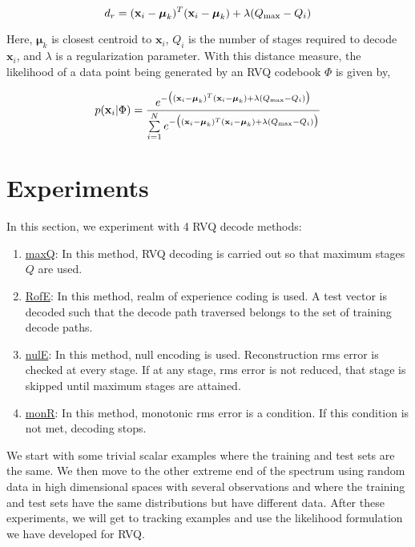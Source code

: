 \begin{equation}
d_r = (\mathbf{x}_i-\boldsymbol\mu_k)^T(\mathbf{x}_i-\boldsymbol\mu_k) + \lambda({Q_{\textrm{max}}-Q_i})
\end{equation}

Here, $\boldsymbol\mu_k$ is closest centroid to $\mathbf{x}_i$, $Q_i$ is the number of stages required to decode $\mathbf{x}_i$, and $\lambda$ is a regularization parameter.  With this distance measure, the likelihood of a data point being generated by an RVQ codebook $\Phi$ is given by,

\begin{equation}
p(\mathbf{x}_i|\Phi) = \frac{e^{-\big((\mathbf{x}_i-\boldsymbol\mu_k)^T(\mathbf{x}_i-\boldsymbol\mu_k) + \lambda({Q_{\textrm{max}}-Q_i})\big)}} {\sum\limits_{i=1}^N e^{-\big((\mathbf{x}_i-\boldsymbol\mu_k)^T(\mathbf{x}_i-\boldsymbol\mu_k) + \lambda({Q_{\textrm{max}}-Q_i})\big)}}
\end{equation}

\section{Experiments}
In this section, we experiment with 4 RVQ decode methods:

\begin{enumerate}
\item \underline{maxQ}: In this method, RVQ decoding is carried out so that maximum stages $Q$ are used.
\item \underline{RofE}: In this method, realm of experience coding is used.  A test vector is decoded such that the decode path traversed belongs to the set of training decode paths.
\item \underline{nulE}: In this method, null encoding is used.  Reconstruction rms error is checked at every stage.  If at any stage, rms error is not reduced, that stage is skipped until maximum stages are attained.
\item \underline{monR}: In this method, monotonic rms error is a condition.  If this condition is not met, decoding stops.
\end{enumerate}

We start with some trivial scalar examples where the training and test sets are the same.  We then move to the other extreme end of the spectrum using random data in high dimensional spaces with several observations and where the training and test sets have the same distributions but have different data.  After these experiments, we will get to tracking examples and use the likelihood formulation we have developed for RVQ.

